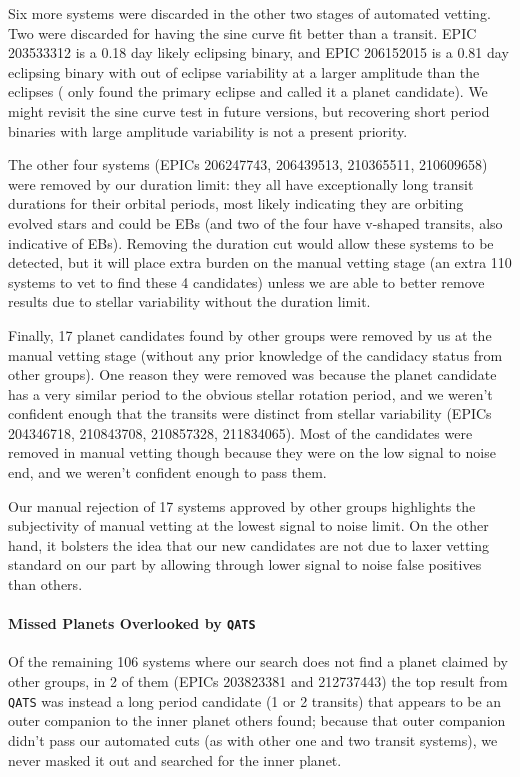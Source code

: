 \documentclass[twocolumn]{aastex62}
\newcommand{\pipeline}[1]{\texttt{#1}}
\begin{document}
Six more systems were discarded in the other two stages of automated
vetting. Two were discarded for having the sine curve fit better than
a transit. EPIC 203533312 is a 0.18 day likely eclipsing binary, and
EPIC 206152015 is a 0.81 day eclipsing binary with out of eclipse
variability at a larger amplitude than the eclipses (\cite{bar16a}
only found the primary eclipse and called it a planet candidate). We
might revisit the sine curve test in future versions, but recovering
short period binaries with large amplitude variability is not a
present priority.

The other four systems (EPICs 206247743, 206439513, 210365511,
210609658) were removed by our duration limit: they all have
exceptionally long transit durations for their orbital periods, most
likely indicating they are orbiting evolved stars and could be EBs
(and two of the four have v-shaped transits, also indicative of
EBs). Removing the duration cut would allow these systems to be
detected, but it will place extra burden on the manual vetting stage
(an extra 110 systems to vet to find these 4 candidates) unless we are
able to better remove results due to stellar variability without the
duration limit.

Finally, 17 planet candidates found by other groups were removed by us
at the manual vetting stage (without any prior knowledge of the
candidacy status from other groups). One reason they were removed was
because the planet candidate has a very similar period to the obvious
stellar rotation period, and we weren't confident enough that the
transits were distinct from stellar variability (EPICs 204346718,
210843708, 210857328, 211834065). Most of the candidates were removed
in manual vetting though because they were on the low signal to noise
end, and we weren't confident enough to pass them.

Our manual rejection of 17 systems approved by other groups highlights
the subjectivity of manual vetting at the lowest signal to noise
limit. On the other hand, it bolsters the idea that our new candidates
are not due to laxer vetting standard on our part by allowing through
lower signal to noise false positives than others.


\paragraph{Missed Planets Overlooked by \pipeline{QATS}}

Of the remaining 106 systems where our search does not find a planet
claimed by other groups, in 2 of them (EPICs 203823381 and 212737443)
the top result from \pipeline{QATS} was instead a long period
candidate (1 or 2 transits) that appears to be an outer companion to
the inner planet others found; because that outer companion didn't
pass our automated cuts (as with other one and two transit systems),
we never masked it out and searched for the inner planet.
\end{document}
